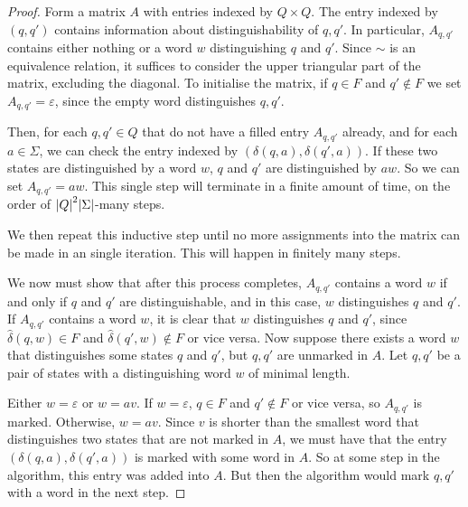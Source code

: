 \begin{proof}
	Form a matrix \( A \) with entries indexed by \( Q \times Q \).
	The entry indexed by \( (q,q') \) contains information about distinguishability of \( q, q' \).
	In particular, \( A_{q,q'} \) contains either nothing or a word \( w \) distinguishing \( q \) and \( q' \).
	Since \( \sim \) is an equivalence relation, it suffices to consider the upper triangular part of the matrix, excluding the diagonal.
	To initialise the matrix, if \( q \in F \) and \( q' \not\in F \) we set \( A_{q,q'} = \varepsilon \), since the empty word distinguishes \( q, q' \).

	Then, for each \( q, q' \in Q \) that do not have a filled entry \( A_{q,q'} \) already, and for each \( a \in \Sigma \), we can check the entry indexed by \( (\delta(q,a), \delta(q',a)) \).
	If these two states are distinguished by a word \( w \), \( q \) and \( q' \) are distinguished by \( aw \).
	So we can set \( A_{q,q'} = aw \).
	This single step will terminate in a finite amount of time, on the order of \( \abs{Q}^2 \abs{\Sigma} \)-many steps.

	We then repeat this inductive step until no more assignments into the matrix can be made in an single iteration.
	This will happen in finitely many steps.

	We now must show that after this process completes, \( A_{q,q'} \) contains a word \( w \) if and only if \( q \) and \( q' \) are distinguishable, and in this case, \( w \) distinguishes \( q \) and \( q' \).
	If \( A_{q,q'} \) contains a word \( w \), it is clear that \( w \) distinguishes \( q \) and \( q' \), since \( \hat\delta(q,w) \in F \) and \( \hat\delta(q',w) \not\in F \) or vice versa.
	Now suppose there exists a word \( w \) that distinguishes some states \( q \) and \( q' \), but \( q, q' \) are unmarked in \( A \).
	Let \( q, q' \) be a pair of states with a distinguishing word \( w \) of minimal length.

	Either \( w = \varepsilon \) or \( w = av \).
	If \( w = \varepsilon \), \( q \in F \) and \( q' \not\in F \) or vice versa, so \( A_{q,q'} \) is marked.
	Otherwise, \( w = av \).
	Since \( v \) is shorter than the smallest word that distinguishes two states that are not marked in \( A \), we must have that the entry \( (\delta(q,a), \delta(q',a)) \) is marked with some word in \( A \).
	So at some step in the algorithm, this entry was added into \( A \).
	But then the algorithm would mark \( q, q' \) with a word in the next step.
\end{proof}
